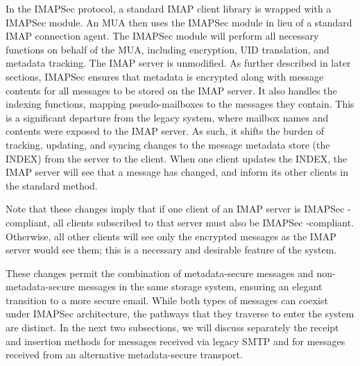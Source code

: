 \documentclass[pageno]{jpaper}
\newcommand{\project}{IMAPSec }
\begin{document}
In the \project protocol, a standard IMAP client library is wrapped with a \project module. An MUA then uses the \project module in lieu of a standard IMAP connection agent. The \project module will perform all necessary functions on behalf of the MUA, including encryption, UID translation, and metadata tracking. The IMAP server is unmodified.
As further described in later sections, \project ensures that metadata is encrypted along with message contents for all messages to be stored on the IMAP server. It also handles the indexing functions, mapping pseudo-mailboxes to the messages they contain. This is a significant departure from the legacy system, where mailbox names and contents were exposed to the IMAP server. As such, it shifts the burden of tracking, updating, and syncing changes to the message metadata store (the INDEX) from the server to the client. When one client updates the INDEX, the IMAP server will see that a message has changed, and inform its other clients in the standard method. 


Note that these changes imply that if one client of an IMAP server is \project-compliant, all clients subscribed to that server must also be \project-compliant. Otherwise, all other clients will see only the encrypted messages as the IMAP server would see them; this is a necessary and desirable feature of the system.

These changes permit the combination of metadata-secure messages and non-metadata-secure messages in the same storage system, ensuring an elegant transition to a more secure email. While both types of messages can coexist under \project architecture, the pathways that they traverse to enter the system are distinct. In the next two subsections, we will discuss separately the receipt and insertion methods for messages received via legacy SMTP and for messages received from an alternative metadata-secure transport.
\end{document}
